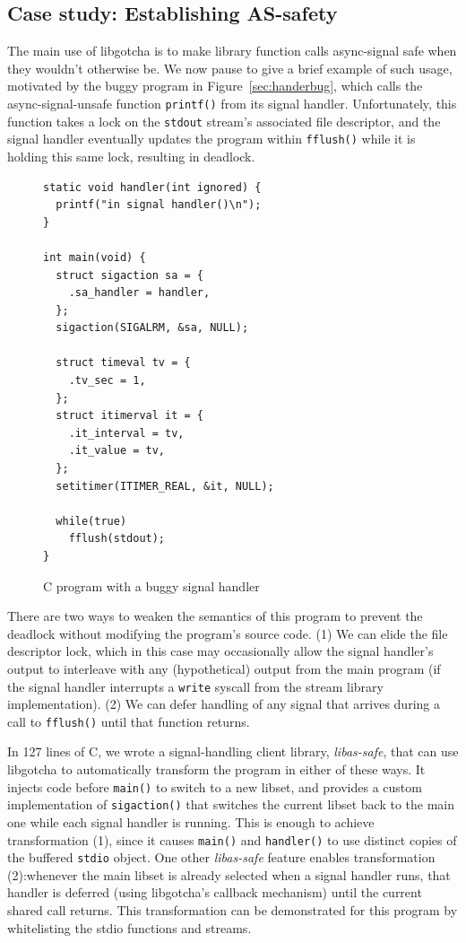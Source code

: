 \subsection{Case study: Establishing AS-safety}
\label{sec:statefulness}

The main use of libgotcha is to make library function calls async-signal safe when
they wouldn't otherwise be.  We now pause to give a brief example of such usage,
motivated by the buggy program in Figure~\ref{sec:handerbug}, which calls the
async-signal-unsafe function \texttt{printf()} from its signal handler.
Unfortunately, this function takes a lock on the \texttt{stdout} stream's associated
file descriptor, and the signal handler eventually updates the program within
\texttt{fflush()} while it is holding this same lock, resulting in deadlock.

\begin{figure}
\begin{verbatim}
static void handler(int ignored) {
  printf("in signal handler()\n");
}

int main(void) {
  struct sigaction sa = {
    .sa_handler = handler,
  };
  sigaction(SIGALRM, &sa, NULL);

  struct timeval tv = {
    .tv_sec = 1,
  };
  struct itimerval it = {
    .it_interval = tv,
    .it_value = tv,
  };
  setitimer(ITIMER_REAL, &it, NULL);

  while(true)
    fflush(stdout);
}
\end{verbatim}
\caption{C program with a buggy signal handler}
\label{sec:handlerbug}
\end{figure}

There are two ways to weaken the semantics of this program to prevent the deadlock
without modifying the program's source code.  (1) We can elide the file descriptor
lock, which in this case may occasionally allow the signal handler's output to
interleave with any (hypothetical) output from the main program (if the signal
handler interrupts a \texttt{write} syscall from the stream library implementation).
(2) We can defer handling of any signal that arrives during a call to
\texttt{fflush()} until that function returns.

In 127 lines of C, we wrote a signal-handling client library, \textit{libas-safe},
that can use libgotcha to automatically transform the program in either of these
ways.  It injects code before \texttt{main()} to switch to a new libset, and
provides a custom implementation of \texttt{sigaction()} that switches the current
libset back to the main one while each signal handler is running.  This is enough to
achieve transformation (1), since it causes \texttt{main()} and \texttt{handler()} to
use distinct copies of the buffered \texttt{stdio} object.  One other
\textit{libas-safe} feature enables transformation (2):\@ whenever the main libset is
already selected when a signal handler runs, that handler is deferred (using
libgotcha's callback mechanism) until the current shared call returns.  This
transformation can be demonstrated for this program by whitelisting the stdio
functions and streams.

